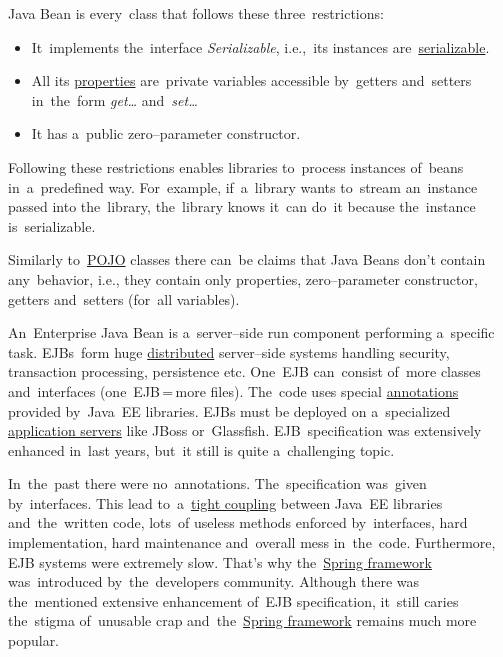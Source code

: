 \label{javabeans}
Java Bean is every~class that follows these three~restrictions:
\begin{itemize}
    \item It~implements the~interface \textit{Serializable}, i.e.,~its instances are~\hyperref[serialization]{serializable}.
    \item All its \hyperref[variablefieldproperty]{properties} are~private variables accessible by~getters and~setters in~the~form \textit{get\dots} and~\textit{set\dots}
    \item It has a~public zero--parameter constructor.
\end{itemize}
\noindent Following these restrictions enables libraries to~process instances of~beans in~a~predefined way. For~example, if~a~library wants to~stream an~instance passed into the~library, the~library knows it~can do~it because the~instance is~serializable.

\warning Similarly to~\hyperref[pojo]{POJO} classes there can~be claims that Java Beans don't contain any~behavior, i.e., they contain only properties, zero--parameter constructor, getters and~setters (for~all variables).

\label{ejb}
An~Enterprise Java Bean is a~server--side run component performing a~specific task. EJBs~form huge \hyperref[distributedsystem]{distributed} server--side systems handling security, transaction processing, persistence etc. One~EJB can~consist of~more classes and~interfaces (one~EJB\,=\,more files). The~code uses special \hyperref[annotations]{annotations} provided by~Java~EE libraries. EJBs must be deployed on a~specialized \hyperref[applicationserver]{application servers} like JBoss or~Glassfish. EJB~specification was extensively enhanced in~last years, but~it still is quite a~challenging topic.

In~the~past there were no~annotations. The~specification was~given by~interfaces. This lead to~a~\hyperref[loosetightcoupling]{tight coupling} between Java~EE libraries and~the~written code, lots~of useless methods enforced by~interfaces, hard implementation, hard maintenance and~overall mess in~the~code. Furthermore, EJB systems were extremely slow. That's why the~\hyperref[springframework]{Spring framework} was~introduced by~the~developers community. Although there was the~mentioned extensive enhancement of~EJB specification, it~still caries the~stigma of~unusable crap and~the~\hyperref[springframework]{Spring framework} remains much more popular.

